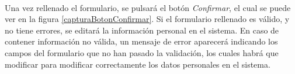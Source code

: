   \paragraph{}Una vez rellenado el formulario, se pulsará el botón
  \textit{Confirmar}, el cual se puede ver en la figura
  \ref{capturaBotonConfirmar}. Si el formulario rellenado es válido, y no tiene
  errores, se editará la información personal en el sistema. En caso de
  contener información no válida, un mensaje de error aparecerá indicando los
  campos del formulario que no han pasado la validación, los cuales habrá que
  modificar para modificar correctamente los datos personales en el sistema.
